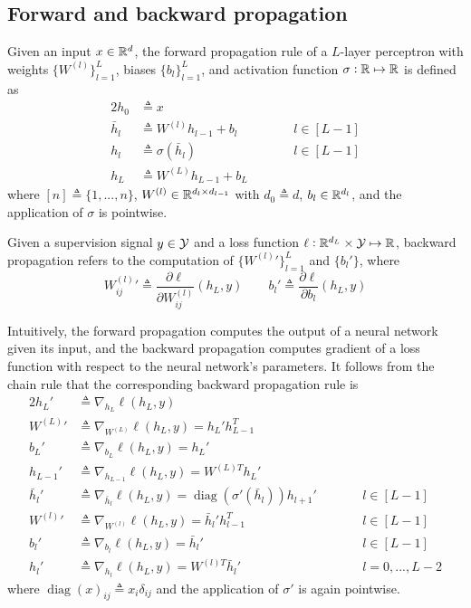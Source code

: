 \documentclass{article}
\DeclareMathOperator{\diag}{diag}
\newcommand{\pp}[2]{{\frac{\partial {#1}}{\partial {#2}}}}
\begin{document}
\subsection{Forward and backward propagation}

Given an input $x \in {\mathbb R}^d$, the forward propagation rule of a $L$-layer perceptron with weights $\{W^{(l)}\}_{l = 1}^L$, biases $\{b_l\}_{l = 1}^L$, and activation function $\sigma: {\mathbb R} \mapsto {\mathbb R}$ is defined as
\begin{alignat*}{2}
h_0 & \triangleq x \\
\bar{h}_l & \triangleq W^{(l)} h_{l - 1} + b_l && \qquad l \in [L - 1] \\
h_l & \triangleq \sigma (\bar{h}_l) && \qquad l \in [L - 1] \\
h_L & \triangleq W^{(L)} h_{L - 1} + b_L
\end{alignat*}
where $[n] \triangleq \{1, ..., n\}$, $W^{(l)} \in {\mathbb R}^{d_l \times d_{l - 1}}$ with $d_0 \triangleq d$, $b_l \in {\mathbb R}^{d_l}$, and the application of $\sigma$ is pointwise.

Given a supervision signal $y \in {\mathcal Y}$ and a loss function $\ell: {\mathbb R}^{d_L} \times {\mathcal Y} \mapsto {\mathbb R}$, backward propagation refers to the computation of $\{W^{(l)}'\}_{l = 1}^L$ and $\{b_l'\}$, where
\[
W_{i j}^{(l)}' \triangleq \pp{\ell}{W_{i j}^{(l)}} (h_L, y) \qquad
b_l' \triangleq \pp{\ell}{b_l} (h_L, y)
\]

Intuitively, the forward propagation computes the output of a neural network given its input, and the backward propagation computes gradient of a loss function with respect to the neural network's parameters.
It follows from the chain rule that the corresponding backward propagation rule is
\begin{alignat*}{2}
h_L' & \triangleq \nabla_{h_L} \ell (h_L, y) \\
W^{(L)}' & \triangleq \nabla_{W^{(L)}} \ell (h_L, y) = h_L' h_{L - 1}^T \\
b_L' & \triangleq \nabla_{b_L} \ell (h_L, y) = h_L' \\
h_{L - 1}' & \triangleq \nabla_{h_{L - 1}} \ell (h_L, y) = W^{(L) T} h_L' \\
\bar{h}_l' & \triangleq \nabla_{\bar{h}_l} \ell (h_L, y) = \diag (\sigma' (\bar{h}_l)) h_{l + 1}' && \qquad l \in [L - 1] \\
W^{(l)}' & \triangleq \nabla_{W^{(l)}} \ell (h_L, y) = \bar{h}_l' h_{l - 1}^T && \qquad l \in [L - 1] \\
b_l' & \triangleq \nabla_{b_l} \ell (h_L, y) = \bar{h}_l' && \qquad l \in [L - 1] \\
h_l' & \triangleq \nabla_{h_l} \ell (h_L, y) = W^{(l) T} \bar{h}_l' && \qquad l = 0, ..., L - 2
\end{alignat*}
where $\diag (x)_{i j} \triangleq x_i \delta_{i j}$ and the application of $\sigma'$ is again pointwise.
\end{document}
